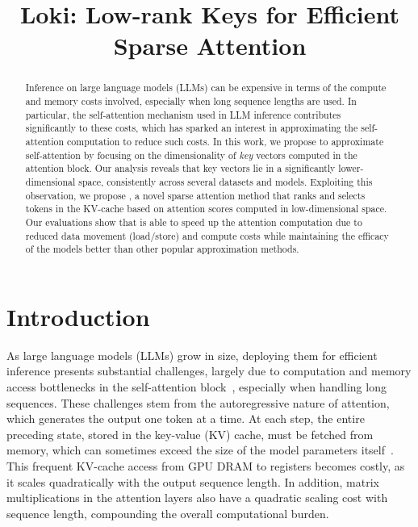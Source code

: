 \title{Loki: Low-rank Keys for Efficient Sparse Attention}



\maketitle

\begin{abstract}
Inference on large language models (LLMs) can be expensive in terms of the
compute and memory costs involved, especially when long sequence lengths are
used. In particular, the self-attention mechanism used in LLM inference
contributes significantly to these costs, which has sparked an interest in
approximating the self-attention computation to reduce such costs. In this
work, we propose to approximate self-attention by focusing on the
dimensionality of {\em key} vectors computed in the attention block. Our
analysis reveals that key vectors lie in a significantly lower-dimensional
space, consistently across several datasets and models. Exploiting this
observation, we propose \emph{\method}, a novel sparse attention method that
ranks and selects tokens in the KV-cache based on attention scores computed in
low-dimensional space. Our evaluations show that \method is able to speed up
the attention computation due to reduced data movement (load/store) and compute
costs while maintaining the efficacy of the models better than other popular
approximation methods.
\end{abstract}

\section{Introduction}
\label{sec:intro}
As large language models (LLMs) grow in size, deploying them for efficient
inference presents substantial challenges, largely due to computation and
memory access bottlenecks in the self-attention block~\citep{transformer},
especially when handling long sequences. These challenges stem from the
autoregressive nature of attention, which generates the output one token at a
time. At each step, the entire preceding state, stored in the key-value (KV)
cache, must be fetched from memory, which can sometimes exceed the size of the
model parameters itself~\citep{woosuk2023vllm}. This frequent KV-cache access
from GPU DRAM to registers becomes costly, as it scales quadratically with the
output sequence length. In addition, matrix multiplications in the
attention layers also have a quadratic scaling cost with sequence length,
compounding the overall computational burden.

